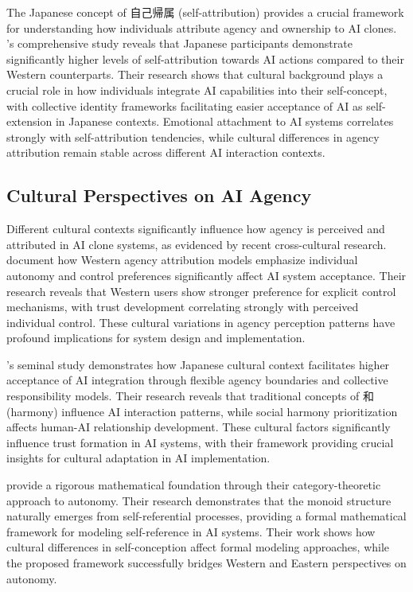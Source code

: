 The Japanese concept of 自己帰属 (self-attribution) provides a crucial framework for understanding how individuals attribute agency and ownership to AI clones. \citet{maeda2023self}'s comprehensive study reveals that Japanese participants demonstrate significantly higher levels of self-attribution towards AI actions compared to their Western counterparts. Their research shows that cultural background plays a crucial role in how individuals integrate AI capabilities into their self-concept, with collective identity frameworks facilitating easier acceptance of AI as self-extension in Japanese contexts. Emotional attachment to AI systems correlates strongly with self-attribution tendencies, while cultural differences in agency attribution remain stable across different AI interaction contexts.

\subsection{Cultural Perspectives on AI Agency}

Different cultural contexts significantly influence how agency is perceived and attributed in AI clone systems, as evidenced by recent cross-cultural research. \citet{dejuan2024western} document how Western agency attribution models emphasize individual autonomy and control preferences significantly affect AI system acceptance. Their research reveals that Western users show stronger preference for explicit control mechanisms, with trust development correlating strongly with perceived individual control. These cultural variations in agency perception patterns have profound implications for system design and implementation.

\citet{nakagawa2019cultural}'s seminal study demonstrates how Japanese cultural context facilitates higher acceptance of AI integration through flexible agency boundaries and collective responsibility models. Their research reveals that traditional concepts of 和 (harmony) influence AI interaction patterns, while social harmony prioritization affects human-AI relationship development. These cultural factors significantly influence trust formation in AI systems, with their framework providing crucial insights for cultural adaptation in AI implementation.

\citet{hirota2024self} provide a rigorous mathematical foundation through their category-theoretic approach to autonomy. Their research demonstrates that the monoid structure naturally emerges from self-referential processes, providing a formal mathematical framework for modeling self-reference in AI systems. Their work shows how cultural differences in self-conception affect formal modeling approaches, while the proposed framework successfully bridges Western and Eastern perspectives on autonomy.

